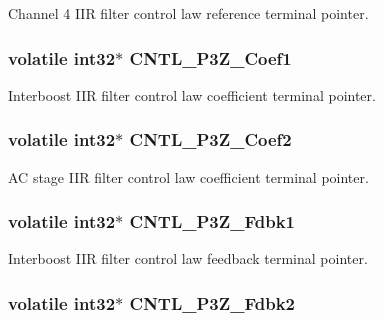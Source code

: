 Channel 4 I\-I\-R filter control law reference terminal pointer. \hypertarget{a00009_a41005c53e7c439f0af28e140f7d3d0ed}{
\subsubsection[{C\-N\-T\-L\-\_\-3\-P3\-Z\-\_\-\-Coef1}]{\setlength{\rightskip}{0pt plus 5cm}volatile int32$\ast$ C\-N\-T\-L\-\_\-P3\-Z\-\_\-\-Coef1}}\label{a00009_a41005c53e7c439f0af28e140f7d3d0ed}
Interboost I\-I\-R filter control law coefficient terminal pointer. \hypertarget{a00009_a7a74642d86ae9a823f58f49db57f8bc8}{
\subsubsection[{C\-N\-T\-L\-\_\-3\-P3\-Z\-\_\-\-Coef2}]{\setlength{\rightskip}{0pt plus 5cm}volatile int32$\ast$ C\-N\-T\-L\-\_\-P3\-Z\-\_\-\-Coef2}}\label{a00009_a7a74642d86ae9a823f58f49db57f8bc8}
A\-C stage I\-I\-R filter control law coefficient terminal pointer. \hypertarget{a00009_a361372a23d9146cd2d077e6c843ec47e}{
\subsubsection[{C\-N\-T\-L\-\_\-3\-P3\-Z\-\_\-\-Fdbk1}]{\setlength{\rightskip}{0pt plus 5cm}volatile int32$\ast$ C\-N\-T\-L\-\_\-P3\-Z\-\_\-\-Fdbk1}}\label{a00009_a361372a23d9146cd2d077e6c843ec47e}
Interboost I\-I\-R filter control law feedback terminal pointer. \hypertarget{a00009_a4676fa58f77cab7e1c4e86255049dfe7}{
\subsubsection[{C\-N\-T\-L\-\_\-3\-P3\-Z\-\_\-\-Fdbk2}]{\setlength{\rightskip}{0pt plus 5cm}volatile int32$\ast$ C\-N\-T\-L\-\_\-P3\-Z\-\_\-\-Fdbk2}}\label{a00009_a4676fa58f77cab7e1c4e86255049dfe7}
